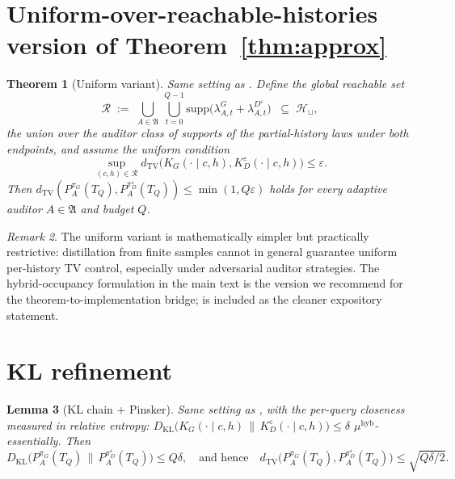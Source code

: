 \documentclass{article}
\theoremstyle{plain}
\newtheorem{theorem}{Theorem}
\newtheorem{lemma}[theorem]{Lemma}
\theoremstyle{definition}
\theoremstyle{remark}
\newtheorem{remark}[theorem]{Remark}
\newcommand{\TV}{\mathrm{TV}}
\newcommand{\KL}{\mathrm{KL}}
\newcommand{\dtv}{d_{\TV}}
\newcommand{\dkl}{D_{\KL}}
\newcommand{\Hist}{\mathcal{H}}
\newcommand{\PpiA}[1]{P_A^{\pi_{#1}}}
\begin{document}
\section{Uniform-over-reachable-histories version of Theorem~\ref{thm:approx}}\label{app:uniform-version}

\begin{theorem}[Uniform variant]\label{thm:approx-uniform}
Same setting as . Define the \emph{global reachable set}
\[
\mathcal R \;:=\; \bigcup_{A \in \mathfrak{A}}\, \bigcup_{t = 0}^{Q-1}
  \mathrm{supp}\big(\lambda_{A, t}^G + \lambda_{A, t}^{D^\varepsilon}\big)
  \;\;\subseteq\; \Hist_\sqcup,
\]
the union over the auditor class of supports of the partial-history laws
under both endpoints, and assume the uniform condition
\[
\sup_{(c, h) \in \mathcal R}
\dtv\big(K_G(\cdot \mid c, h), K_D^\varepsilon(\cdot \mid c, h)\big) \le \varepsilon.
\]
Then $\dtv(\PpiA{G}(T_Q), P_A^{\pi_D^\varepsilon}(T_Q)) \le \min(1, Q\varepsilon)$
holds for \emph{every} adaptive auditor $A \in \mathfrak A$ and budget $Q$.
\end{theorem}

\begin{remark}
The uniform variant is mathematically simpler but practically restrictive:
distillation from finite samples cannot in general guarantee uniform per-history
TV control, especially under adversarial auditor strategies. The
hybrid-occupancy formulation in the main text is the version we recommend
for the theorem-to-implementation bridge;  is included
as the cleaner expository statement.
\end{remark}

\section{KL refinement}\label{app:kl}

\begin{lemma}[KL chain + Pinsker]\label{lem:kl}
Same setting as , with the per-query closeness measured in
relative entropy:
$\dkl\big(K_G(\cdot \mid c, h) \,\|\, K_D^\varepsilon(\cdot \mid c, h)\big) \le \delta$
$\mu^{\mathrm{hyb}}$-essentially. Then
\[
\dkl\big(\PpiA{G}(T_Q) \,\|\, P_A^{\pi_D^\varepsilon}(T_Q)\big) \le Q\delta,
\quad\text{and hence}\quad
\dtv\big(\PpiA{G}(T_Q), P_A^{\pi_D^\varepsilon}(T_Q)\big) \le \sqrt{Q\delta / 2}.
\]
\end{lemma}
\end{document}
